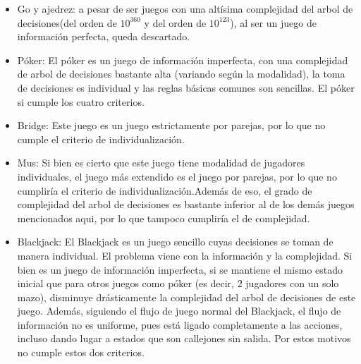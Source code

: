 \begin{itemize}
\item Go y ajedrez: a pesar de ser juegos con una altísima complejidad del arbol de decisiones(del orden de $10^{360}$ y del orden de $10^{123}$), al ser un juego de información perfecta, queda descartado.
\item Póker: El póker es un juego de información imperfecta, con una complejidad de arbol de decisiones bastante alta (variando según la modalidad), la toma de decisiones es individual y las reglas básicas comunes son sencillas. El póker si cumple los cuatro criterios.
\item Bridge: Este juego es un juego estrictamente por parejas, por lo que no cumple el criterio de individualización.
\item Mus: Si bien es cierto que este juego tiene modalidad de jugadores individuales, el juego más extendido es el juego por parejas, por lo que no cumpliría el criterio de individualización.Además de eso, el grado de complejidad del arbol de decisiones es bastante inferior al de los demás juegos mencionados aqui, por lo que tampoco cumpliría el de complejidad.
\item Blackjack: El Blackjack es un juego sencillo cuyas decisiones se toman de manera individual. El problema viene con la información y la complejidad. Si bien es un juego de información imperfecta, si se mantiene el mismo estado inicial que para otros juegos como póker (es decir, 2 jugadores con un solo mazo), disminuye drásticamente la complejidad del arbol de decisiones de este juego. Además, siguiendo el flujo de juego normal del Blackjack, el flujo de información no es uniforme, pues está ligado completamente a las acciones, incluso dando lugar a estados que son callejones sin salida. Por estos motivos no cumple estos dos criterios.
\end{itemize} 

